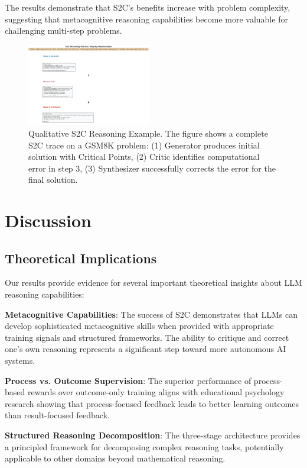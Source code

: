 \documentclass[10pt,twocolumn]{article}
\newcommand{\ssc}{\textsc{S2C}}
\begin{document}
The results demonstrate that \ssc{}'s benefits increase with problem complexity, suggesting that metacognitive reasoning capabilities become more valuable for challenging multi-step problems.

\begin{figure}[t]
\centering
\includegraphics[width=0.48\textwidth]{graphs/qualitative_s2c_example.pdf}
\caption{Qualitative S2C Reasoning Example. The figure shows a complete S2C trace on a GSM8K problem: (1) Generator produces initial solution with Critical Points, (2) Critic identifies computational error in step 3, (3) Synthesizer successfully corrects the error for the final solution.}
\label{fig:qualitative_example}
\end{figure}

\section{Discussion}

\subsection{Theoretical Implications}

Our results provide evidence for several important theoretical insights about LLM reasoning capabilities:

\textbf{Metacognitive Capabilities}: The success of \ssc{} demonstrates that LLMs can develop sophisticated metacognitive skills when provided with appropriate training signals and structured frameworks. The ability to critique and correct one's own reasoning represents a significant step toward more autonomous AI systems.

\textbf{Process vs. Outcome Supervision}: The superior performance of process-based rewards over outcome-only training aligns with educational psychology research showing that process-focused feedback leads to better learning outcomes than result-focused feedback.

\textbf{Structured Reasoning Decomposition}: The three-stage architecture provides a principled framework for decomposing complex reasoning tasks, potentially applicable to other domains beyond mathematical reasoning.
\end{document}

